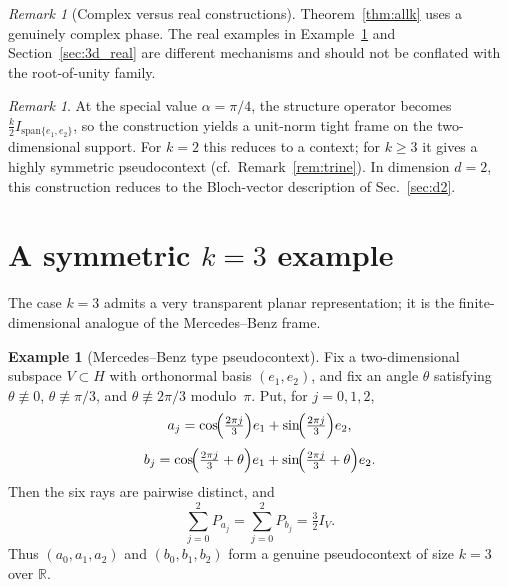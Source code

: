 \documentclass[
  twocolumn,
  aps,
  pra,
  floatfix,
  amsmath,amssymb,
  longbibliography
]{revtex4-2}
\theoremstyle{definition}
\newtheorem{example}[theorem]{Example}
\theoremstyle{remark}
\newtheorem{remark}[theorem]{Remark}
\begin{document}
\begin{remark}[Complex versus real constructions]
Theorem~\ref{thm:allk} uses a genuinely complex phase. The real examples
in Example~\ref{ex:mb} and Section~\ref{sec:3d_real} are different
mechanisms and should not be conflated with the root-of-unity family.
\end{remark}

\begin{remark}\label{rem:tight}
At the special value $\alpha=\pi/4$, the structure operator becomes
$\frac{k}{2}I_{\mathrm{span}\{e_1,e_2\}}$, so the construction yields
a unit-norm tight frame on the two-dimensional support.  For $k=2$
this reduces to a context; for $k\ge 3$ it gives a highly symmetric
pseudocontext (cf.\ Remark~\ref{rem:trine}).  In dimension $d=2$,
this construction reduces to the Bloch-vector description of
Sec.~\ref{sec:d2}.
\end{remark}

\section{A symmetric \texorpdfstring{$k=3$}{k=3} example}
\label{sec:symk3}

The case $k=3$ admits a very transparent planar representation; it is
the finite-dimensional analogue of the Mercedes--Benz frame.

\begin{example}[Mercedes--Benz type pseudocontext]\label{ex:mb}
Fix a two-dimensional subspace $V\subset H$ with orthonormal basis
$(e_1,e_2)$, and fix an angle $\theta$ satisfying
$\theta\not\equiv 0$, $\theta\not\equiv\pi/3$, and
$\theta\not\equiv 2\pi/3$ modulo~$\pi$.
Put, for $j=0,1,2$,
\[
  a_j=\cos\!\Bigl(\tfrac{2\pi j}{3}\Bigr)e_1
     +\sin\!\Bigl(\tfrac{2\pi j}{3}\Bigr)e_2,
\]
\[
  b_j=\cos\!\Bigl(\tfrac{2\pi j}{3}+\theta\Bigr)e_1
     +\sin\!\Bigl(\tfrac{2\pi j}{3}+\theta\Bigr)e_2.
\]
Then the six rays are pairwise distinct, and
\[
  \sum_{j=0}^{2}P_{a_j}=\sum_{j=0}^{2}P_{b_j}=\tfrac{3}{2}I_V.
\]
Thus $(a_0,a_1,a_2)$ and $(b_0,b_1,b_2)$ form a genuine
pseudocontext of size $k=3$ over $\mathbb{R}$.
\end{example}
\end{document}
